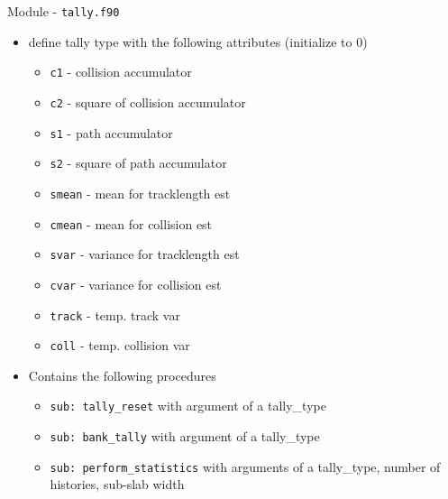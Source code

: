 \documentclass{beamer}
\begin{document}
\begin{frame}{Module - \texttt{tally.f90}}

  \begin{itemize}
    \item define tally type with the following attributes (initialize to 0)
    \begin{itemize}
      \item \texttt{c1} - collision accumulator
      \item \texttt{c2} - square of collision accumulator
      \item \texttt{s1} - path accumulator
      \item \texttt{s2} - square of path accumulator
      \item \texttt{smean} - mean for tracklength est
      \item \texttt{cmean} - mean for collision est
      \item \texttt{svar} - variance for tracklength est
      \item \texttt{cvar} - variance for collision est
      \item \texttt{track} - temp. track var
      \item \texttt{coll} - temp. collision var
    \end{itemize}
    \vfill \item Contains the following procedures
    \begin{itemize}
      \item \texttt{sub: tally\_reset} with argument of a tally\_type
      \vfill\item \texttt{sub: bank\_tally} with argument of a tally\_type
      \vfill\item \texttt{sub: perform\_statistics} with arguments of a tally\_type, number of histories, sub-slab width
    \end{itemize}
  \end{itemize}

\end{frame}
\end{document}
